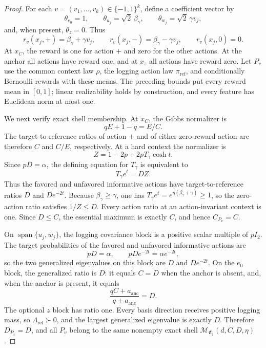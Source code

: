 \documentclass{article}
\begin{document}
\begin{proof}
For each \(v=(v_1,\ldots,v_k)\in\{-1,1\}^k\), define a coefficient vector by
\[
\theta_{e_0}=1,\qquad
\theta_{u_j}=\sqrt2\,\beta_\gamma,\qquad
\theta_{w_j}=\sqrt2\,\gamma v_j,
\]
and, when present, \(\theta_z=0\). Thus
\[
r_v(x_j,+)=\beta_\gamma+\gamma v_j,\qquad
r_v(x_j,-)=\beta_\gamma-\gamma v_j,\qquad
r_v(x_j,0)=0.
\]
At \(x_C\), the reward is one for action \(+\) and zero for the other actions. At the anchor all actions have reward one, and at \(x_z\) all actions have reward zero. Let \(P_v\) use the common context law \(\rho\), the logging action law \(\pi_{\mathrm{ref}}\), and conditionally Bernoulli rewards with these means. The preceding bounds put every reward mean in \([0,1]\); linear realizability holds by construction, and every feature has Euclidean norm at most one.

We next verify exact shell membership. At \(x_C\), the Gibbs normalizer is
\[
qE+1-q=E/C.
\]
The target-to-reference ratios of action \(+\) and of either zero-reward action are therefore \(C\) and \(C/E\), respectively. At a hard context the normalizer is
\[
Z=1-2p+2pT_\gamma\cosh t.
\]
Since \(pD=\alpha\), the defining equation for \(T_\gamma\) is equivalent to
\[
T_\gamma e^t=DZ.
\]
Thus the favored and unfavored informative actions have target-to-reference ratios \(D\) and \(De^{-2t}\). Because \(\beta_\gamma\ge\gamma\), one has \(T_\gamma e^t=e^{\eta(\beta_\gamma+\gamma)}\ge1\), so the zero-action ratio satisfies \(1/Z\le D\). Every action ratio at an action-invariant context is one. Since \(D\le C\), the essential maximum is exactly \(C\), and hence \(C_{P_v}=C\).

On \(\operatorname{span}\{u_j,w_j\}\), the logging covariance block is a positive scalar multiple of \(pI_2\). The target probabilities of the favored and unfavored informative actions are
\[
pD=\alpha,\qquad pDe^{-2t}=\alpha e^{-2t},
\]
so the two generalized eigenvalues on this block are \(D\) and \(De^{-2t}\). On the \(e_0\) block, the generalized ratio is \(D\): it equals \(C=D\) when the anchor is absent, and, when the anchor is present, it equals
\[
\frac{qC+a_{\mathrm{anc}}}{q+a_{\mathrm{anc}}}=D.
\]
The optional \(z\) block has ratio one. Every basis direction receives positive logging mass, so \(\Lambda_{\mathrm{ref}}\succ0\), and the largest generalized eigenvalue is exactly \(D\). Therefore \(D_{P_v}=D\), and all \(P_v\) belong to the same nonempty exact shell \(\mathcal M_{\mathfrak E_1}(d,C,D,\eta)\).


\end{proof}
\end{document}
